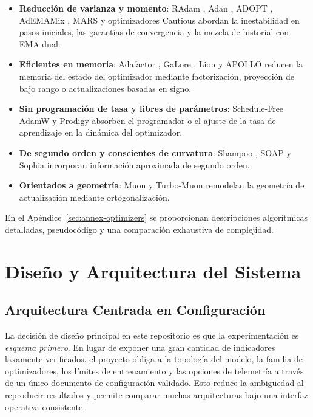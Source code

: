 \documentclass[11pt,a4paper]{article}
\begin{document}
\begin{itemize}[leftmargin=*]
    \item \textbf{Reducción de varianza y momento}: RAdam \citep{liu_variance_2019}, Adan \citep{xie_adan_2022}, ADOPT \citep{taniguchi_adopt_2024}, AdEMAMix \citep{pagliardini_ademamix_2024}, MARS \citep{yuan_mars_2024} y optimizadores Cautious \citep{liang_cautious_2024} abordan la inestabilidad en pasos iniciales, las garantías de convergencia y la mezcla de historial con EMA dual.
    \item \textbf{Eficientes en memoria}: Adafactor \citep{shazeer_adafactor_2018}, GaLore \citep{zhao_galore_2024}, Lion \citep{chen_symbolic_2023} y APOLLO \citep{zhu2025apollosgdlikememoryadamwlevel} reducen la memoria del estado del optimizador mediante factorización, proyección de bajo rango o actualizaciones basadas en signo.
    \item \textbf{Sin programación de tasa y libres de parámetros}: Schedule-Free AdamW \citep{defazio_road_2024} y Prodigy \citep{mishchenko_prodigy_2023} absorben el programador o el ajuste de la tasa de aprendizaje en la dinámica del optimizador.
    \item \textbf{De segundo orden y conscientes de curvatura}: Shampoo \citep{gupta_shampoo_2018}, SOAP \citep{vyas_soap_2024} y Sophia \citep{liu_sophia_2023} incorporan información aproximada de segundo orden.
    \item \textbf{Orientados a geometría}: Muon \citep{shen_convergence_2025} y Turbo-Muon \citep{boissin_turbo-muon_2025} remodelan la geometría de actualización mediante ortogonalización.
\end{itemize}

En el Apéndice~\ref{sec:annex-optimizers} se proporcionan descripciones algorítmicas detalladas, pseudocódigo y una comparación exhaustiva de complejidad.

\section{Diseño y Arquitectura del Sistema}
\label{sec:system-design}

\subsection{Arquitectura Centrada en Configuración}
\label{sec:config-centric-architecture}

La decisión de diseño principal en este repositorio es que la experimentación es \emph{esquema primero}. En lugar de exponer una gran cantidad de indicadores laxamente verificados, el proyecto obliga a la topología del modelo, la familia de optimizadores, los límites de entrenamiento y las opciones de telemetría a través de un único documento de configuración validado. Esto reduce la ambigüedad al reproducir resultados y permite comparar muchas arquitecturas bajo una interfaz operativa consistente.
\end{document}

